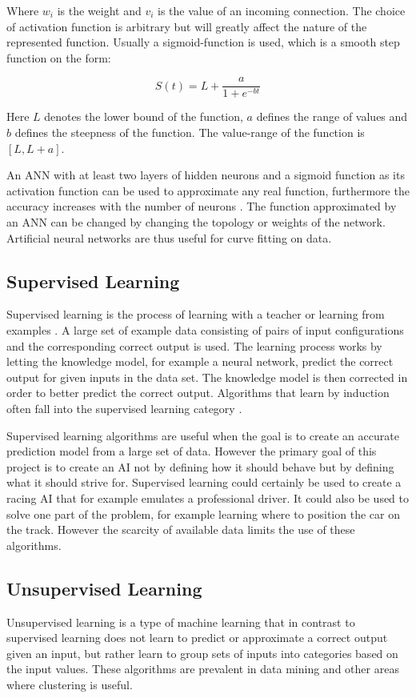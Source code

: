 Where $w_i$ is the weight and $v_i$ is the value of an incoming connection. The choice of activation function is arbitrary but will greatly affect the nature of the represented function. Usually a sigmoid-function is used, which is a smooth step function on the form:

\begin{equation}
    S(t) = L + \frac{a}{1 + e^{-bt}}
\end{equation}

Here $L$ denotes the lower bound of the function, $a$ defines the range of values and $b$ defines the steepness of the function. The value-range of the function is $[L, L+a]$. 

An ANN with at least two layers of hidden neurons and a sigmoid function as its activation function can be used to approximate any real function, furthermore the accuracy increases with the number of neurons \cite{mitchel:approximation}. The function approximated by an ANN can be changed by changing the topology or weights of the network. Artificial neural networks are thus useful for curve fitting on data. 

\subsection{Supervised Learning}
Supervised learning is the process of learning with a teacher or learning from examples \cite{haykin:supervised}. A large set of example data consisting of pairs of input configurations and the corresponding correct output is used. The learning process works by letting the knowledge model, for example a neural network, predict the correct output for given inputs in the data set. The knowledge model is then corrected in order to better predict the correct output. Algorithms that learn by induction often fall into the supervised learning category \cite{glossary}. 

Supervised learning algorithms are useful when the goal is to create an accurate prediction model from a large set of data. However the primary goal of this project is to create an AI not by defining how it should behave but by defining what it should strive for. Supervised learning could certainly be used to create a racing AI that for example emulates a professional driver. It could also be used to solve one part of the problem, for example learning where to position the car on the track. However the scarcity of available data limits the use of these algorithms.  

\subsection{Unsupervised Learning}
Unsupervised learning is a type of machine learning that in contrast to supervised learning does not learn to predict or approximate a correct output given an input, but rather learn to group sets of inputs into categories based on the input values. These algorithms are prevalent in data mining and other areas where clustering is useful. 
